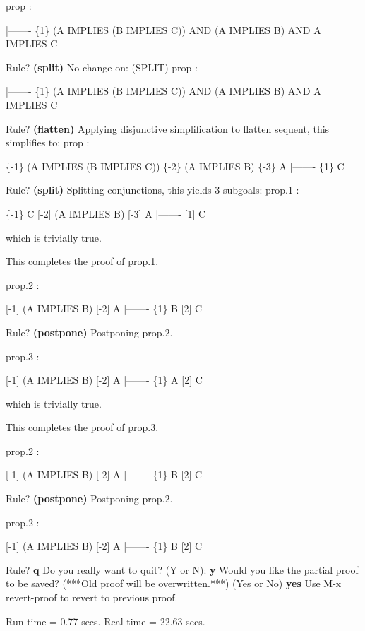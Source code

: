 \begin{pvsscript}
     prop :   

       |-------
     \{1\}   (A IMPLIES (B IMPLIES C)) AND (A IMPLIES B) AND A IMPLIES C

     Rule? {\bf (split)}
     No change on: (SPLIT) 
     prop :   

       |-------
     \{1\}   (A IMPLIES (B IMPLIES C)) AND (A IMPLIES B) AND A IMPLIES C

     Rule? {\bf (flatten)}
     Applying disjunctive simplification to flatten sequent,
     this simplifies to: 
     prop :   

     \{-1\}   (A IMPLIES (B IMPLIES C))
     \{-2\}   (A IMPLIES B)
     \{-3\}   A
       |-------
     \{1\}   C

     Rule? {\bf (split)}
     Splitting conjunctions,
     this yields  3 subgoals: 
     prop.1 :   

     \{-1\}   C
     [-2]   (A IMPLIES B)
     [-3]   A
       |-------
     [1]   C

     which is trivially true.

     This completes the proof of prop.1.

     prop.2 :   

     [-1]   (A IMPLIES B)
     [-2]   A
       |-------
     \{1\}   B
     [2]   C

     Rule? {\bf (postpone)}
     Postponing prop.2.

     prop.3 :   

     [-1]   (A IMPLIES B)
     [-2]   A
       |-------
     \{1\}   A
     [2]   C

     which is trivially true.

     This completes the proof of prop.3.

     prop.2 :   

     [-1]   (A IMPLIES B)
     [-2]   A
       |-------
     \{1\}   B
     [2]   C

     Rule? {\bf (postpone)}
     Postponing prop.2.

     prop.2 :   

     [-1]   (A IMPLIES B)
     [-2]   A
       |-------
     \{1\}   B
     [2]   C

     Rule? {\bf q}
     Do you really want to quit?   (Y or N): {\bf y}
     Would you like the partial proof to be saved? 
     (***Old proof will be overwritten.***)
      (Yes or No) {\bf yes}
     Use M-x revert-proof to revert to previous proof.

     Run time  = 0.77 secs.
     Real time = 22.63 secs.
\end{pvsscript}

